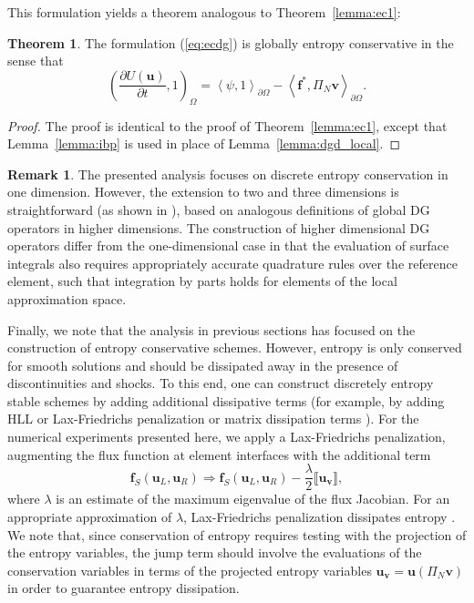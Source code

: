 \documentclass[preprint,10pt]{article}
\theoremstyle{definition}
\theoremstyle{lemma}
\newtheorem*{remark}{Remark}
\theoremstyle{theorem}
\newtheorem{theorem}{Theorem}
\theoremstyle{assumption}
\newcommand{\pd}[2]{\frac{\partial#1}{\partial#2}}
\newcommand{\LRp}[1]{\left( #1 \right)}
\newcommand{\LRa}[1]{\left\langle #1 \right\rangle}
\newcommand{\jump}[1] {\ensuremath{\llbracket#1\rrbracket}}
\newcommand{\note}[1]{{\color{blue}{#1}}}
\begin{document}

This formulation yields a theorem analogous to Theorem~\ref{lemma:ec1}:
\begin{theorem}
\label{thm:ecdg_global}
The formulation (\ref{eq:ecdg}) is globally entropy conservative in the sense that
\[
\LRp{\pd{U(\bm{u})}{t},1}_{\Omega} =  \LRa{\psi,1}_{\partial \Omega}-\LRa{{\bm{f}^*, \Pi_N\bm{v}}}_{\partial \Omega}.
\]
\end{theorem}
\begin{proof}
The proof is identical to the proof of Theorem~\ref{lemma:ec1}, except that Lemma~\ref{lemma:ibp} is used in place of Lemma~\ref{lemma:dgd_local}.
\end{proof}

\begin{remark}
The presented analysis focuses on discrete entropy conservation in one dimension.  However, the extension to two and three dimensions is straightforward (as shown in \cite{chen2017entropy}), based on analogous definitions of global DG operators in higher dimensions.  The construction of higher dimensional DG operators differ from the one-dimensional case in that the evaluation of surface integrals also requires appropriately accurate quadrature rules over the reference element, such that integration by parts holds for elements of the local approximation space.  
\end{remark}

Finally, we note that the analysis in previous sections has focused on the construction of entropy conservative schemes.  However, entropy is only conserved for smooth solutions and should be dissipated away in the presence of discontinuities and shocks.  To this end, one can construct discretely entropy stable schemes by adding additional dissipative terms (for example, by adding HLL or Lax-Friedrichs penalization \cite{chen2017entropy} or matrix dissipation terms \cite{chandrashekar2013kinetic, winters2017uniquely}).  For the numerical experiments presented here, we apply a Lax-Friedrichs penalization, augmenting the flux function at element interfaces with the additional term
\[
 \bm{f}_S\LRp{\bm{u}_L,\bm{u}_R}\Rightarrow \bm{f}_S\LRp{\bm{u}_L,\bm{u}_R} - \frac{\lambda}{2}\jump{\bm{u}_{\bm{v}}},
\]
where $\lambda$ is an estimate of the maximum eigenvalue of the flux Jacobian.  For an appropriate approximation of $\lambda$, Lax-Friedrichs penalization dissipates entropy \cite{chen2017entropy}.  We note that, since conservation of entropy requires testing with the projection of the entropy variables, the jump term should involve the evaluations of the conservation variables in terms of the projected entropy variables $\bm{u}_{\bm{v}} = \bm{u}\LRp{\Pi_N \bm{v}}$ in order to guarantee entropy dissipation.  
\end{document}
